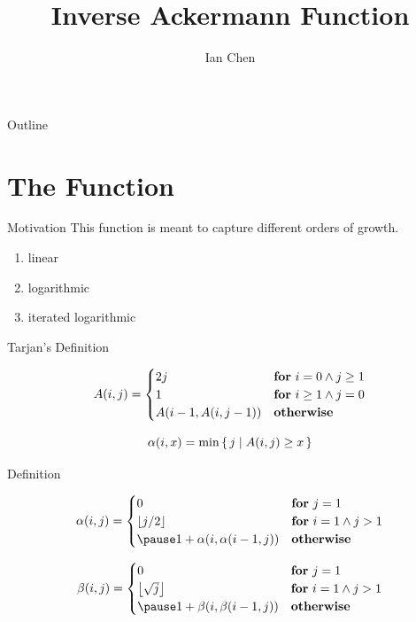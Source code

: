 \documentclass[aspectratio=169]{beamer}
\title{Inverse Ackermann Function}
\author{Ian Chen}
\date{}
\begin{document}
\begin{frame}
	\titlepage
\end{frame}

\begin{frame}{Outline}
	\tableofcontents
\end{frame}

\section{The Function}
\frame{\sectionpage}

\begin{frame}{Motivation}
	This function is meant to capture different orders of growth.
	\pause
	\begin{enumerate}
		\item linear \pause
		\item logarithmic \pause
		\item iterated logarithmic
	\end{enumerate}
\end{frame}

\begin{frame}{Tarjan's Definition}
	\begin{defn}[Tarjan '75]
		\[
			A(i, j) =
			\begin{cases}
				2j                    & \textbf{for} \ i = 0 \land j \ge 1 \\
				1                     & \textbf{for} \ i \ge 1 \land j = 0 \\
				A(i - 1, A(i, j - 1)) & \textbf{otherwise}
			\end{cases}
		\]
	\end{defn}
	\pause
	\begin{defn}[Tarjan '75]
		\[
			\alpha(i, x) = \min \set{j | A(i, j) \ge x}
		\]
	\end{defn}
\end{frame}

\begin{frame}{Definition}
	\begin{defn}
		\[
			\alpha(i, j) =
			\begin{cases}
				0                               & \for \ j = 1             \\
				\floor{j / 2}                   & \for \ i = 1 \land j > 1 \\
				\pause
				1 + \alpha(i, \alpha(i - 1, j)) & \ow
			\end{cases}
		\]
	\end{defn}
	\pause
	\begin{defn}
		\[
			\beta(i, j) =
			\begin{cases}
				0                             & \for \ j = 1             \\
				\floor{\sqrt{j}}              & \for \ i = 1 \land j > 1 \\
				\pause
				1 + \beta(i, \beta(i - 1, j)) & \ow
			\end{cases}
		\]
	\end{defn}
\end{frame}
\end{document}
